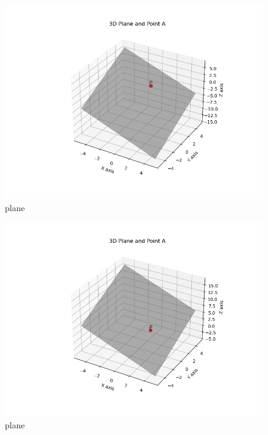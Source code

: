 \documentclass[journal]{IEEEtran}
\begin{document}
\begin{figure}[H]
\centering
\includegraphics[width=0.7\columnwidth]{figs/fig1.png} 
\caption{plane}
\label{}
\end{figure}
\begin{figure}[H]
\centering
\includegraphics[width=0.7\columnwidth]{figs/fig2.png} 
\caption{plane}
\label{}
\end{figure}
\end{document}
